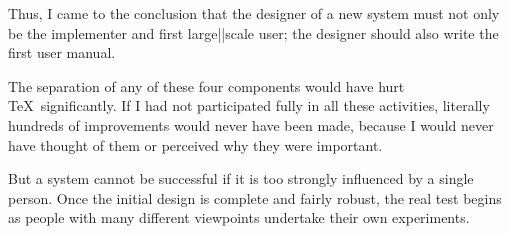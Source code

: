 Thus, I came to the conclusion that the designer of a new
system must not only be the implementer and first
large||scale user; the designer should also write the first
user manual.

The separation of any of these four components would have
hurt \TeX\ significantly. If I had not participated fully in
all these activities, literally hundreds of improvements
would never have been made, because I would never have
thought of them or perceived why they were important.

But a system cannot be successful if it is too strongly
influenced by a single person. Once the initial design is
complete and fairly robust, the real test begins as people
with many different viewpoints undertake their own
experiments.
